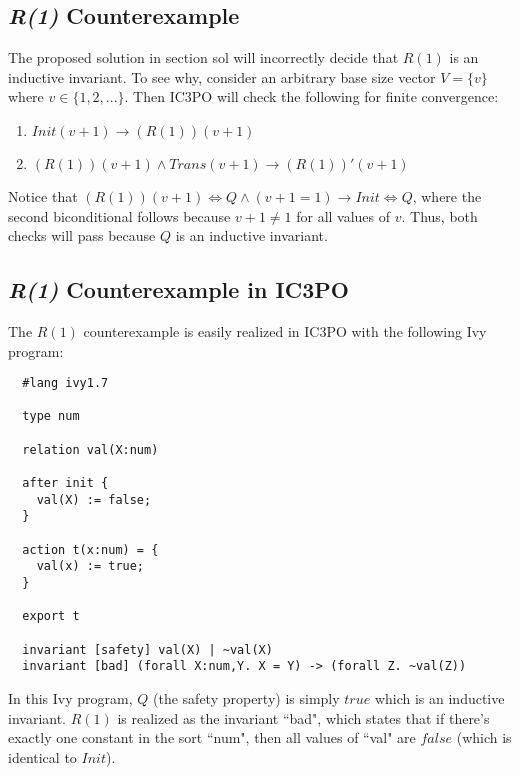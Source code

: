 \documentclass[12pt]{article}
\begin{document}
\subsection{\textit{R(1)} Counterexample}
The proposed solution in section sol will incorrectly decide that $R(1)$ is an inductive invariant.  To see why, consider an arbitrary base size vector $V = \{v\}$ where $v \in \{1,2,...\}$.  Then IC3PO will check the following for finite convergence:
\begin{enumerate}
  \item $Init(v+1) \rightarrow (R(1))(v+1)$
  \item $(R(1))(v+1) \land Trans(v+1) \rightarrow (R(1))'(v+1)$
\end{enumerate}

Notice that $(R(1))(v+1) \iff Q \land (v+1=1) \rightarrow Init \iff Q$, where the second biconditional follows because $v+1 \neq 1$ for all values of $v$.  Thus, both checks will pass because $Q$ is an inductive invariant.

\subsection{\textit{R(1)} Counterexample in IC3PO}
The $R(1)$ counterexample is easily realized in IC3PO with the following Ivy program:

\begin{verbatim}
  #lang ivy1.7

  type num

  relation val(X:num)

  after init {
    val(X) := false;
  }

  action t(x:num) = {
    val(x) := true;
  }

  export t

  invariant [safety] val(X) | ~val(X)
  invariant [bad] (forall X:num,Y. X = Y) -> (forall Z. ~val(Z))
\end{verbatim}

In this Ivy program, $Q$ (the safety property) is simply $true$ which is an inductive invariant.  $R(1)$ is realized as the invariant ``bad", which states that if there's exactly one constant in the sort ``num", then all values of ``val" are $false$ (which is identical to $Init$).
\end{document}

